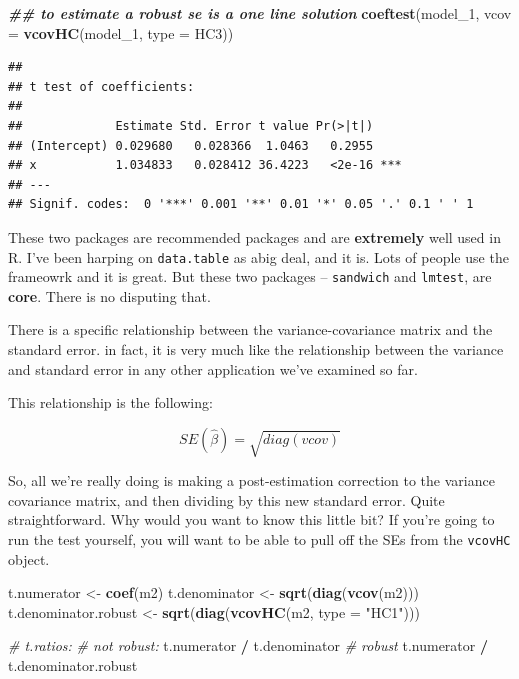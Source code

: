\documentclass[
]{article}
\newenvironment{Shaded}{\begin{snugshade}}{\end{snugshade}}
\newcommand{\AttributeTok}[1]{\textcolor[rgb]{0.13,0.29,0.53}{#1}}
\newcommand{\CommentTok}[1]{\textcolor[rgb]{0.56,0.35,0.01}{\textit{#1}}}
\newcommand{\DocumentationTok}[1]{\textcolor[rgb]{0.56,0.35,0.01}{\textbf{\textit{#1}}}}
\newcommand{\FunctionTok}[1]{\textcolor[rgb]{0.13,0.29,0.53}{\textbf{#1}}}
\newcommand{\NormalTok}[1]{#1}
\newcommand{\OtherTok}[1]{\textcolor[rgb]{0.56,0.35,0.01}{#1}}
\newcommand{\SpecialCharTok}[1]{\textcolor[rgb]{0.81,0.36,0.00}{\textbf{#1}}}
\newcommand{\StringTok}[1]{\textcolor[rgb]{0.31,0.60,0.02}{#1}}
\theoremstyle{definition}
\theoremstyle{definition}
\theoremstyle{definition}
\theoremstyle{definition}
\theoremstyle{remark}
\begin{document}
\begin{Shaded}
\begin{Highlighting}[]
\DocumentationTok{\#\# to estimate a robust se is a one line solution }
\FunctionTok{coeftest}\NormalTok{(model\_1, }\AttributeTok{vcov =} \FunctionTok{vcovHC}\NormalTok{(model\_1, }\AttributeTok{type =} \StringTok{\textquotesingle{}HC3\textquotesingle{}}\NormalTok{))}
\end{Highlighting}
\end{Shaded}

\begin{verbatim}
## 
## t test of coefficients:
## 
##             Estimate Std. Error t value Pr(>|t|)    
## (Intercept) 0.029680   0.028366  1.0463   0.2955    
## x           1.034833   0.028412 36.4223   <2e-16 ***
## ---
## Signif. codes:  0 '***' 0.001 '**' 0.01 '*' 0.05 '.' 0.1 ' ' 1
\end{verbatim}

These two packages are recommended packages and are \textbf{extremely} well used in R. I've been harping on \texttt{data.table} as abig deal, and it is. Lots of people use the frameowrk and it is great. But these two packages -- \texttt{sandwich} and \texttt{lmtest}, are \textbf{core}. There is no disputing that.

There is a specific relationship between the variance-covariance matrix and the standard error. in fact, it is very much like the relationship between the variance and standard error in any other application we've examined so far.

This relationship is the following:

\[
  SE(\hat{\beta}) = \sqrt{diag(vcov)}
\]

So, all we're really doing is making a post-estimation correction to the variance covariance matrix, and then dividing by this new standard error. Quite straightforward. Why would you want to know this little bit? If you're going to run the test yourself, you will want to be able to pull off the SEs from the \texttt{vcovHC} object.

\begin{Shaded}
\begin{Highlighting}[]
\NormalTok{t.numerator   }\OtherTok{\textless{}{-}} \FunctionTok{coef}\NormalTok{(m2)}
\NormalTok{t.denominator }\OtherTok{\textless{}{-}} \FunctionTok{sqrt}\NormalTok{(}\FunctionTok{diag}\NormalTok{(}\FunctionTok{vcov}\NormalTok{(m2)))}
\NormalTok{t.denominator.robust }\OtherTok{\textless{}{-}} \FunctionTok{sqrt}\NormalTok{(}\FunctionTok{diag}\NormalTok{(}\FunctionTok{vcovHC}\NormalTok{(m2, }\AttributeTok{type =} \StringTok{"HC1"}\NormalTok{)))}

\CommentTok{\# t.ratios: }
\CommentTok{\# not robust: }
\NormalTok{t.numerator }\SpecialCharTok{/}\NormalTok{ t.denominator}
\CommentTok{\# robust }
\NormalTok{t.numerator }\SpecialCharTok{/}\NormalTok{ t.denominator.robust}
\end{Highlighting}
\end{Shaded}
\end{document}
